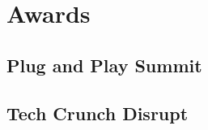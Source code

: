 \documentclass[]{jhearn-resume}
\begin{document}
\begin{minipage}[t]{0.34\textwidth}
\section{Awards}
\subsection{Plug and Play Summit}
\sectionsep

\subsection{Tech Crunch Disrupt}
\sectionsep

\end{minipage} 

\end{document}
